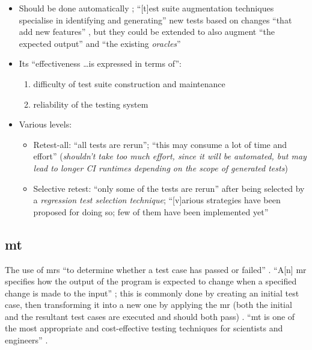 \begin{itemize}
      \item Should be done automatically \cite[p.~481]{peters_software_2000};
            ``[t]est suite augmentation techniques specialise in
            identifying and generating'' new tests based on changes ``that add
            new features'' , but they could be extended to
            also augment ``the expected output'' and ``the existing
            \emph{oracles}'' \cite[p.~516]{barr_oracle_2015}
      \item Its ``effectiveness \dots is expressed in terms of'':
            \begin{enumerate}
                  \item difficulty of test suite construction and maintenance
                  \item reliability of the testing system
                        \cite[pp.~481-482]{peters_software_2000}
            \end{enumerate}
      \item Various levels:
            \begin{itemize}
                  \item Retest-all: ``all tests are rerun''; ``this may consume
                        a lot of time and effort''
                        \cite[p.~411]{van_vliet_software_2000} (\emph{shouldn't
                              take too much effort, since it will be automated,
                              but may lead to longer CI runtimes depending on
                              the scope of generated tests})
                  \item Selective retest: ``only some of the tests are rerun''
                        after being selected by a \emph{regression test
                              selection technique}; ``[v]arious strategies have
                        been proposed for doing so; few of them have been
                        implemented yet'' \cite[p.~411]{van_vliet_software_2000}
            \end{itemize}
\end{itemize}

\subsection{\acf{mt}}
\label{chap:notes:sec:metamorphic-testing}
The use of \acfp{mr} ``to determine whether a test case has passed or failed''
\cite[p.~67]{kanewala_metamorphic_2019}. ``A[n] \acs{mr} specifies how the
output of the program is expected to change when a specified change is made to
the input'' \cite[p.~67]{kanewala_metamorphic_2019}; this is commonly done by
creating an initial test case, then transforming it into a new one by applying
the \acs{mr} (both the initial and the resultant test cases are executed and
should both pass) \cite[p.~68]{kanewala_metamorphic_2019}. ``\acs{mt} is one of
the most appropriate and cost-effective testing techniques for scientists and
engineers'' \cite[p.~72]{kanewala_metamorphic_2019}.

